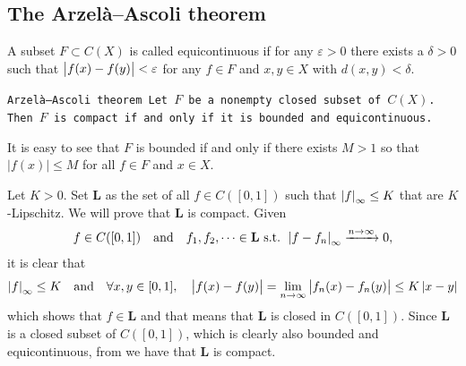 \documentclass[11pt,a4paper]{article}
\begin{document}
\subsection{The Arzelà--Ascoli theorem}

\begin{definition}[Equicontinuity]
  A subset $F \subset C(X)$ is called equicontinuous if
  for any $\varepsilon > 0$ there exists a $\delta > 0$ such that
  $\left\lvert f(x) - f(y)\right\rvert < \varepsilon$ for any $f \in F$ and $x,y \in X$ with
  $d(x,y) < \delta$.
\end{definition}
\begin{theorem}\label{thm:AA}
  \tt{Arzelà--Ascoli theorem} Let $F$ be a nonempty closed subset of 
  $C(X)$. Then $F$ is compact if and only if it is bounded and 
  equicontinuous.
\end{theorem}
\begin{remark}
  It is easy to see that $F$ is bounded if and only if there exists 
  $M > 1$ so that $|f (x)| \le M$ for all $f \in F$ and $x \in X$.
\end{remark}
\begin{example}
  Let $K > 0$. Set $\mathbf L$ as the set of all $f \in C([0,1])$ such that 
  $\left\lvert f\right\rvert_{\infty} \le K$ that are $K$-Lipschitz.
  We will prove that $\mathbf L$ is compact. Given
  \[
    f \in C([0,1]) \quad \text{and} \quad f_1,f_2,\dots \in \mathbf L \text{ s.t. }
    \left\lvert f - f_n\right\rvert_{\infty} \xrightarrow{n \to \infty} 0,
  \]
  it is clear that
  \[
    \left\lvert f\right\rvert_{\infty} \le K \quad \text{and} \quad \forall x,y \in [0,1], \quad
    \left\lvert f(x) - f(y)\right\rvert =
    \lim_{n \to \infty} \left\lvert f_n(x) - f_n(y)\right\rvert \le
    K \left\lvert x - y\right\rvert
  \]
  which shows that $f \in \mathbf L$ and that means that $\mathbf L$ is
  closed in $C([0,1])$. Since $\mathbf L$ is a closed subset of $C([0,1])$,
  which is clearly also bounded and equicontinuous, from 
  we have that $\mathbf L$ is compact.
\end{example}
\end{document}
